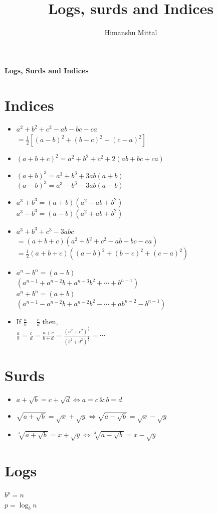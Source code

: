 \documentclass[11pt,a4paper,landscape]{article}
\author{Himanshu Mittal}
\title{Logs, surds and Indices}
\begin{document}
\begin{multicols*}{3}
\textbf{\Huge{Logs, Surds and Indices}}

\section{Indices}
	\begin{itemize}
	\item $a^2+b^2+c^2-ab-bc-ca$\\
	$=\frac{1}{2}\left[(a-b)^2+(b-c)^2+(c-a)^2\right]$
	\item $(a+b+c)^2=a^2+b^2+c^2+2(ab+bc+ca)$
	\item $(a+b)^3=a^3+b^3+3ab(a+b)$\\
		$(a-b)^3=a^3-b^3-3ab(a-b)$
	\item $a^3+b^3=(a+b)(a^2-ab+b^2)$\\
		$a^3-b^3=(a-b)(a^2+ab+b^2)$
	\item $a^3+b^3+c^3-3abc$\\
	$=(a+b+c)\left(a^2+b^2+c^2-ab-bc-ca\right)$\\
	$=\frac{1}{2}(a+b+c)\left((a-b)^2+(b-c)^2+(c-a)^2\right)$
	\item $a^n-b^n=(a-b)$\\
	$\left(a^{n-1}+a^{n-2}b+a^{n-3}b^2+\cdots+b^{n-1}\right)$\\
		$a^n+b^n=(a+b)$\\
		$\left(a^{n-1}-a^{n-2}b+a^{n-2}b^2-\cdots+ab^{n-2}-b^{n-1}\right)$
	\item If $\frac{a}{b}=\frac{c}{d}$ then,\\
		$\frac{a}{b}=\frac{c}{d}=\frac{a+c}{b+d}=\frac{\left(a^2+c^2\right)^{\frac{1}{2}}}{\left(b^2+d^2\right)^{\frac{1}{2}}}=\cdots$
	\end{itemize}
\vfill\null
\columnbreak
\section{Surds}
	\begin{itemize}
	\item $a+\sqrt{b}=c+\sqrt{d}\Leftrightarrow a=c\,\&\,b=d$
	\item $\sqrt{a+\sqrt{b}}=\sqrt{x}+\sqrt{y}\Leftrightarrow\sqrt{a-\sqrt{b}}=\sqrt{x}-\sqrt{y}$
	\item $\sqrt[3]{a+\sqrt{b}}=x+\sqrt{y}\Leftrightarrow\sqrt[3]{a-\sqrt{b}}=x-\sqrt{y}$
	\end{itemize}
\section{Logs}
	\begin{center}
	$b^p=n$\\
	$p=\log_b n$
	\end{center}

\end{multicols*}
\end{document}
